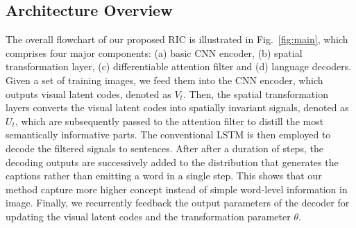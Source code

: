 \documentclass[10pt,twocolumn,letterpaper]{article}
\begin{document}
	\subsection{Architecture Overview}
	The overall flowchart of our proposed RIC is illustrated in Fig.~\ref{fig:main}, which comprises four major components: (a) basic CNN encoder, (b) spatial transformation layer, (c) differentiable attention filter and (d) language decoders. Given a set of training images, we feed them into the CNN encoder, which outputs visual latent codes, denoted as $V_{t}$. Then, the spatial transformation layers converts the visual latent codes into spatially invariant signals, denoted as $U_{t}$, which are subsequently passed to the attention filter to distill the most semantically informative parts. The conventional LSTM is then employed to decode the filtered signals to sentences. After after a duration of steps, the decoding outputs are successively added to the distribution that generates the captions rather than emitting a word in a single step. This shows that our method capture more higher concept instead of simple word-level information in image. Finally, we recurrently feedback the output parameters of the decoder for updating the visual latent codes and the transformation parameter $\theta$.
	
	
\end{document}
